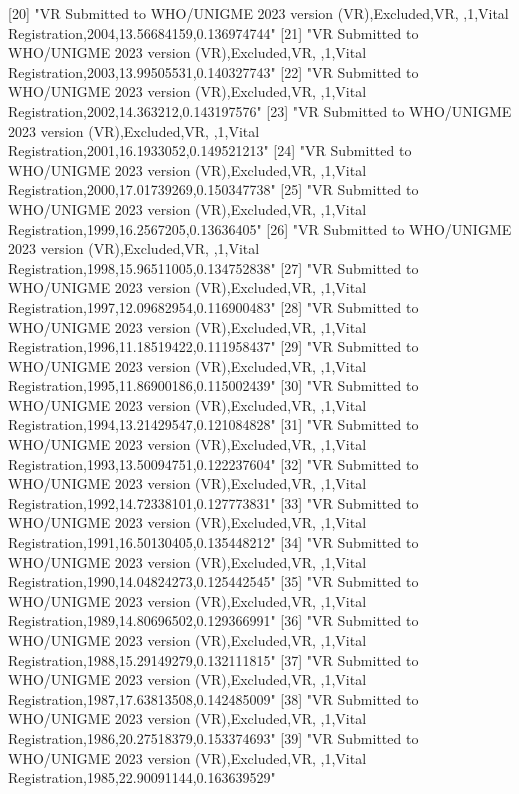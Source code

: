 [20] "VR Submitted to WHO/UNIGME 2023 version (VR),Excluded,VR, ,1,Vital Registration,2004,13.56684159,0.136974744"                 
 [21] "VR Submitted to WHO/UNIGME 2023 version (VR),Excluded,VR, ,1,Vital Registration,2003,13.99505531,0.140327743"                 
 [22] "VR Submitted to WHO/UNIGME 2023 version (VR),Excluded,VR, ,1,Vital Registration,2002,14.363212,0.143197576"                   
 [23] "VR Submitted to WHO/UNIGME 2023 version (VR),Excluded,VR, ,1,Vital Registration,2001,16.1933052,0.149521213"                  
 [24] "VR Submitted to WHO/UNIGME 2023 version (VR),Excluded,VR, ,1,Vital Registration,2000,17.01739269,0.150347738"                 
 [25] "VR Submitted to WHO/UNIGME 2023 version (VR),Excluded,VR, ,1,Vital Registration,1999,16.2567205,0.13636405"                   
 [26] "VR Submitted to WHO/UNIGME 2023 version (VR),Excluded,VR, ,1,Vital Registration,1998,15.96511005,0.134752838"                 
 [27] "VR Submitted to WHO/UNIGME 2023 version (VR),Excluded,VR, ,1,Vital Registration,1997,12.09682954,0.116900483"                 
 [28] "VR Submitted to WHO/UNIGME 2023 version (VR),Excluded,VR, ,1,Vital Registration,1996,11.18519422,0.111958437"                 
 [29] "VR Submitted to WHO/UNIGME 2023 version (VR),Excluded,VR, ,1,Vital Registration,1995,11.86900186,0.115002439"                 
 [30] "VR Submitted to WHO/UNIGME 2023 version (VR),Excluded,VR, ,1,Vital Registration,1994,13.21429547,0.121084828"                 
 [31] "VR Submitted to WHO/UNIGME 2023 version (VR),Excluded,VR, ,1,Vital Registration,1993,13.50094751,0.122237604"                 
 [32] "VR Submitted to WHO/UNIGME 2023 version (VR),Excluded,VR, ,1,Vital Registration,1992,14.72338101,0.127773831"                 
 [33] "VR Submitted to WHO/UNIGME 2023 version (VR),Excluded,VR, ,1,Vital Registration,1991,16.50130405,0.135448212"                 
 [34] "VR Submitted to WHO/UNIGME 2023 version (VR),Excluded,VR, ,1,Vital Registration,1990,14.04824273,0.125442545"                 
 [35] "VR Submitted to WHO/UNIGME 2023 version (VR),Excluded,VR, ,1,Vital Registration,1989,14.80696502,0.129366991"                 
 [36] "VR Submitted to WHO/UNIGME 2023 version (VR),Excluded,VR, ,1,Vital Registration,1988,15.29149279,0.132111815"                 
 [37] "VR Submitted to WHO/UNIGME 2023 version (VR),Excluded,VR, ,1,Vital Registration,1987,17.63813508,0.142485009"                 
 [38] "VR Submitted to WHO/UNIGME 2023 version (VR),Excluded,VR, ,1,Vital Registration,1986,20.27518379,0.153374693"                 
 [39] "VR Submitted to WHO/UNIGME 2023 version (VR),Excluded,VR, ,1,Vital Registration,1985,22.90091144,0.163639529"                 
